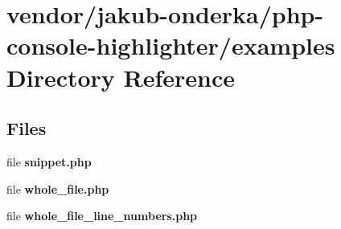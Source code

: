 \section{vendor/jakub-\/onderka/php-\/console-\/highlighter/examples Directory Reference}
\label{dir_3e465780fa8d2492dc9bed862b9cbd00}
\subsection*{Files}
\begin{DoxyCompactItemize}
\item 
file {\bf snippet.\+php}
\item 
file {\bf whole\+\_\+file.\+php}
\item 
file {\bf whole\+\_\+file\+\_\+line\+\_\+numbers.\+php}
\end{DoxyCompactItemize}
